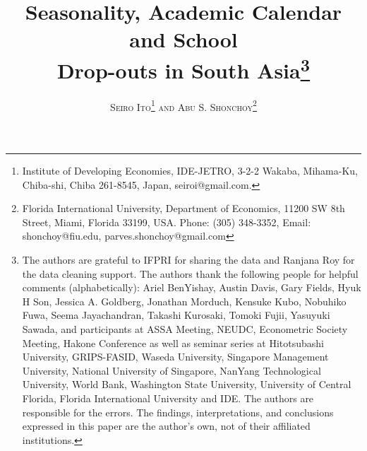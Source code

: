 \documentclass[12pt,letterpaper]{article}
\newcommand{\0}{\ensuremath{\mbox{\boldmath $0$}}}
\begin{document}
\singlespacing

\title{
\vspace{-1.25cm}
Seasonality, Academic Calendar and School \\
Drop-outs in South Asia\thanks{\protect%
The authors are grateful to IFPRI for sharing the data and Ranjana Roy for the data cleaning support. The authors thank the following people for helpful comments (alphabetically): Ariel BenYishay, Austin Davis, Gary Fields, Hyuk H Son, Jessica A. Goldberg, Jonathan Morduch, Kensuke Kubo, Nobuhiko Fuwa, Seema Jayachandran, Takashi Kurosaki, Tomoki Fujii, Yasuyuki Sawada, and participants at ASSA Meeting, NEUDC, Econometric Society Meeting, Hakone Conference as well as seminar series at Hitotsubashi University, GRIPS-FASID, Waseda University, Singapore Management University, National University of Singapore, NanYang Technological University, World Bank, Washington State University, University of Central Florida, Florida International University and IDE. The authors are responsible for the errors. The findings, interpretations, and conclusions expressed in this paper are the author's own, not of their affiliated institutions. \vspace{0.25em}}} 

\author
{\textsc{Seiro Ito}\thanks{
Institute of Developing Economies, IDE-JETRO, 3-2-2 Wakaba, Mihama-Ku, Chiba-shi, Chiba 261-8545, Japan, seiroi@gmail.com.}
{\textsc{ and Abu S. Shonchoy}}\thanks{
Florida International University, Department of Economics, 11200 SW 8th Street, Miami, Florida 33199, USA. Phone: (305) 348-3352,
Email: shonchoy@fiu.edu, parves.shonchoy@gmail.com}}


\maketitle

\vspace{2.5em}
\end{document}
